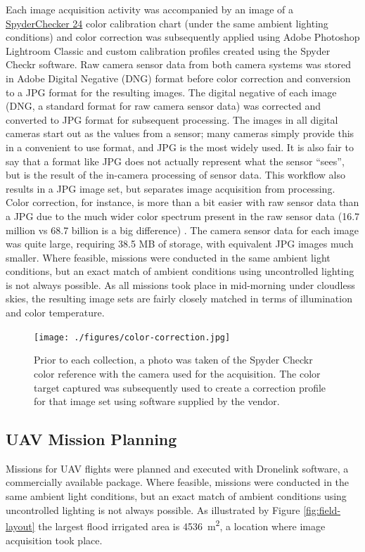 \documentclass[letterpaper]{report}
\begin{document}
Each image acquisition activity was accompanied by an image of a \href{https://www.datacolor.com/spyder/products/spyder-checkr-photo/} {SpyderChecker 24} color calibration chart (under the same ambient lighting conditions) and color correction was subsequently applied using Adobe Photoshop Lightroom Classic and custom calibration profiles created using the Spyder Checkr software. Raw camera sensor data from both camera systems was stored in Adobe Digital Negative (DNG) format before color correction and conversion to a JPG format for the resulting images. The digital negative of each image (DNG, a standard format for raw camera sensor data) was corrected and converted to JPG format for subsequent processing. The images in all digital cameras start out as the values from a sensor; many cameras simply provide this in a convenient to use format, and JPG is the most widely used. It is also fair to say that a format like JPG does not actually represent what the sensor ``sees'', but is the result of the in-camera processing of sensor data. This workflow also results in a JPG image set, but separates image acquisition from processing. Color correction, for instance, is more than a bit easier with raw sensor data than a JPG due to  the much wider color spectrum present in the raw sensor data (16.7 million vs 68.7 billion is a big difference) \parencite{AdobeUnknown-re}. The camera sensor data for each image was quite large, requiring 38.5 MB of storage, with equivalent JPG images much smaller.
Where feasible, missions were conducted in the same ambient light conditions, but an exact match of ambient conditions using uncontrolled lighting is not always possible. As all missions took place in mid-morning under cloudless skies, the resulting image sets are fairly closely matched in terms of illumination and color temperature.

\begin{figure}[h!]
	\centering
	\texttt{[image: ./figures/color-correction.jpg]}
	\caption[Color correction target and image set identification]{Prior to each collection, a photo was taken of the Spyder Checkr color reference with the camera used for the acquisition. The color target captured was subsequently used to create a correction profile for that image set using software supplied by the vendor.}
	\label{fig:color-correction}
\end{figure}

\subsection{UAV Mission Planning}
Missions for UAV flights were planned and executed with Dronelink software, a commercially available package.  Where feasible, missions were conducted in the same ambient light conditions, but an exact match of ambient conditions using uncontrolled lighting is not always possible.
As illustrated by Figure \ref{fig:field-layout} the largest flood irrigated area is \SI{4536}{\metre\squared}, a location where image acquisition took place.  
\end{document}
